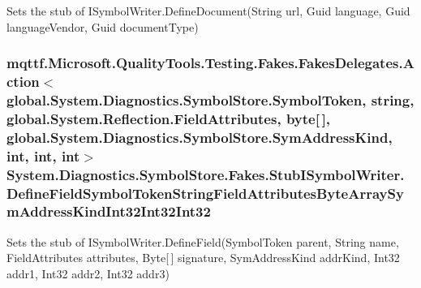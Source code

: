 Sets the stub of I\-Symbol\-Writer.\-Define\-Document(\-String url, Guid language, Guid language\-Vendor, Guid document\-Type)

\hypertarget{class_system_1_1_diagnostics_1_1_symbol_store_1_1_fakes_1_1_stub_i_symbol_writer_a93c9ec5d765e7e3f45606fb4eb352bc8}{
\subsubsection[{Define\-Field\-Symbol\-Token\-String\-Field\-Attributes\-Byte\-Array\-Sym\-Address\-Kind\-Int32\-Int32\-Int32}]{\setlength{\rightskip}{0pt plus 5cm}mqttf.\-Microsoft.\-Quality\-Tools.\-Testing.\-Fakes.\-Fakes\-Delegates.\-Action$<$global.\-System.\-Diagnostics.\-Symbol\-Store.\-Symbol\-Token, string, global.\-System.\-Reflection.\-Field\-Attributes, byte\mbox{[}$\,$\mbox{]}, global.\-System.\-Diagnostics.\-Symbol\-Store.\-Sym\-Address\-Kind, int, int, int$>$ System.\-Diagnostics.\-Symbol\-Store.\-Fakes.\-Stub\-I\-Symbol\-Writer.\-Define\-Field\-Symbol\-Token\-String\-Field\-Attributes\-Byte\-Array\-Sym\-Address\-Kind\-Int32\-Int32\-Int32}}\label{class_system_1_1_diagnostics_1_1_symbol_store_1_1_fakes_1_1_stub_i_symbol_writer_a93c9ec5d765e7e3f45606fb4eb352bc8}


Sets the stub of I\-Symbol\-Writer.\-Define\-Field(\-Symbol\-Token parent, String name, Field\-Attributes attributes, Byte\mbox{[}$\,$\mbox{]} signature, Sym\-Address\-Kind addr\-Kind, Int32 addr1, Int32 addr2, Int32 addr3)

